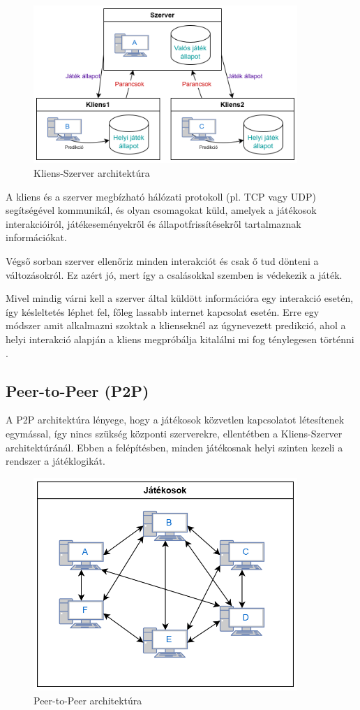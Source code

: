 \documentclass[]{thesis-ekf}
\theoremstyle{definition}
\theoremstyle{remark}
\begin{document}
\begin{figure}[ht!]
	\centering
	\includegraphics[width=10cm]{ClientServer}
	\caption{Kliens-Szerver architektúra}
	\label{fig-clientserver}
\end{figure}

A kliens és a szerver megbízható hálózati protokoll (pl. TCP vagy UDP) segítségével kommunikál, és olyan csomagokat küld, amelyek a játékosok interakcióiról, játékeseményekről és állapotfrissítésekről tartalmaznak információkat. 
 
Végső sorban szerver ellenőriz minden interakciót és csak ő tud dönteni a változásokról. Ez azért jó, mert így a csalásokkal szemben is védekezik a játék. 

Mivel mindig várni kell a szerver által küldött információra egy interakció esetén, így késleltetés léphet fel, főleg lassabb internet kapcsolat esetén. Erre egy módszer amit alkalmazni szoktak a klienseknél az úgynevezett predikció, ahol a helyi interakció alapján a kliens megpróbálja kitalálni mi fog ténylegesen történni \cite{MediumClientServer}.

\subsection{Peer-to-Peer (P2P)}

A P2P architektúra lényege, hogy a játékosok közvetlen kapcsolatot létesítenek egymással, így nincs szükség központi szerverekre, ellentétben a Kliens-Szerver architektúránál. Ebben a felépítésben, minden játékosnak helyi szinten kezeli a rendszer a játéklogikát.

\begin{figure}[ht!]
	\centering
	\includegraphics[width=10cm]{P2P}
	\caption{Peer-to-Peer architektúra}
	\label{fig-p2p}
\end{figure}
\end{document}
